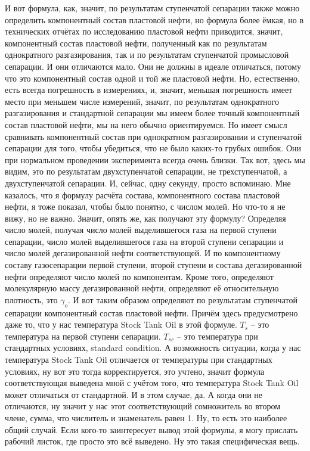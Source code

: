 \documentclass[main.tex]{subfiles}
\begin{document}
И вот формула, как, значит, по результатам ступенчатой сепарации также можно определить компонентный состав пластовой нефти, но формула более ёмкая, но в технических отчётах по исследованию пластовой нефти приводится, значит, компонентный состав пластовой нефти, полученный как по результатам однократного разгазирования, так и по результатам ступенчатой промысловой сепарации.
И они отличаются мало.
Они не должны в идеале отличаться, потому что это компонентный состав одной и той же пластовой нефти.
Но, естественно, есть всегда погрешность в измерениях, и, значит, меньшая погрешность имеет место при меньшем числе измерений, значит, по результатам однократного разгазирования и стандартной сепарации мы имеем более точный компонентный состав пластовой нефти, мы на него обычно ориентируемся.
Но имеет смысл сравнивать компонентный состав при однократном разгазировании и ступенчатой сепарации для того, чтобы убедиться, что не было каких-то грубых ошибок.
Они при нормальном проведении эксперимента всегда очень близки.
Так вот, здесь мы видим, это по результатам двухступенчатой сепарации, не трехступенчатой, а двухступенчатой сепарации.
И, сейчас, одну секунду, просто вспоминаю.
Мне казалось, что я формулу расчёта состава, компонентного состава пластовой нефти, я тоже показал, чтобы было понятно, с числом молей.
Но что-то я не вижу, но не важно.
Значит, опять же, как получают эту формулу?
Определяя число молей, получая число молей выделившегося газа на первой ступени сепарации, число молей выделившегося газа на второй ступени сепарации и число молей дегазированной нефти соответствующей.
И по компонентному составу газосепарации первой ступени, второй ступени и состава дегазированной нефти определяют число молей по компонентам.
Кроме того, определяют молекулярную массу дегазированной нефти, определяют её относительную плотность, это $\gamma_o$.
И вот таким образом определяют по результатам ступенчатой сепарации компонентный состав пластовой нефти.
Причём здесь предусмотрено даже то, что у нас температура Stock Tank Oil в этой формуле.
$T_s$ -- это температура на первой ступени сепарации.
$T_{sc}$ -- это температура при стандартных условиях, standard condition.
А возможность ситуации, когда у нас температура Stock Tank Oil отличается от температуры при стандартных условиях, ну вот это тогда корректируется, это учтено, значит формула соответствующая выведена мной с учётом того, что температура Stock Tank Oil может отличаться от стандартной.
И в этом случае, да.
А когда они не отличаются, ну значит у нас этот соответствующий сомножитель во втором члене, сумма, что числитель и знаменатель равен 1.
Ну, то есть это наиболее общий случай.
Если кого-то заинтересует вывод этой формулы, я могу прислать рабочий листок, где просто это всё выведено.
Ну это такая специфическая вещь.
\end{document}
